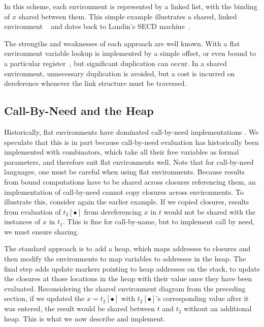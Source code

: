 \documentclass[preprint]{sigplanconf}
\begin{document}
\begin{center}
\end{center}
In this scheme, each environment is represented by a linked list, with
the binding of $x$ shared between them. This simple example
illustrates a shared, linked environment ~\cite{appel1988optimizing}
and dates back to Landin's SECD machine~\cite{landin1964mechanical}.

The strengths and weaknesses of each approach are well known.  With a flat
environment variable lookup is implemented by a simple offset, or even
bound to a particular register~\cite{jonesstg, appel2006compiling},
but significant duplication can occur.  In a shared environment, unnecessary
duplication is avoided, but a cost is incurred on dereference whenever the
link structure must be traversed.

\subsection{Call-By-Need and the Heap}

Historically, flat environments have dominated call-by-need implementations
\cite{jonesstg, TIM, johnsson1984efficient,
boquist1997grin}. We speculate that this is in part because call-by-need
evaluation has historically been implemented with combinators, which take all
their free variables as formal parameters, and therefore suit flat environments
well. Note that for call-by-need languages, one must be careful when using flat
environments.  Because results from bound computations have to be shared across
closures referencing them, an implementation of call-by-need cannot copy
closures across environments. To illustrate this, consider again the earlier
example.  If we copied closures, results from evaluation of $t_2[\bullet]$ from
dereferencing $x$ in $t$ would not be shared with the instances of $x$ in
$t_1$.  This is fine for call-by-name, but to implement call by need, we must
ensure sharing.

The standard approach is to add a heap, which maps addresses to closures
\cite{jonesstg, TIM, johnsson1984efficient, sestoft} and then
modify the environments to map variables to addresses in the heap. The final
step adds update markers pointing to heap addresses on the stack, to update
the closures at those locations in the heap with their value once they have been
evaluated.  Reconsidering the shared environment diagram from the preceding
section, if we updated the $x=t_2[\bullet]$ with $t_2[\bullet]$'s corresponding
value after it was entered, the result would be shared between $t$ and $t_2$
without an additional heap. This is what we now describe and implement.
\end{document}
